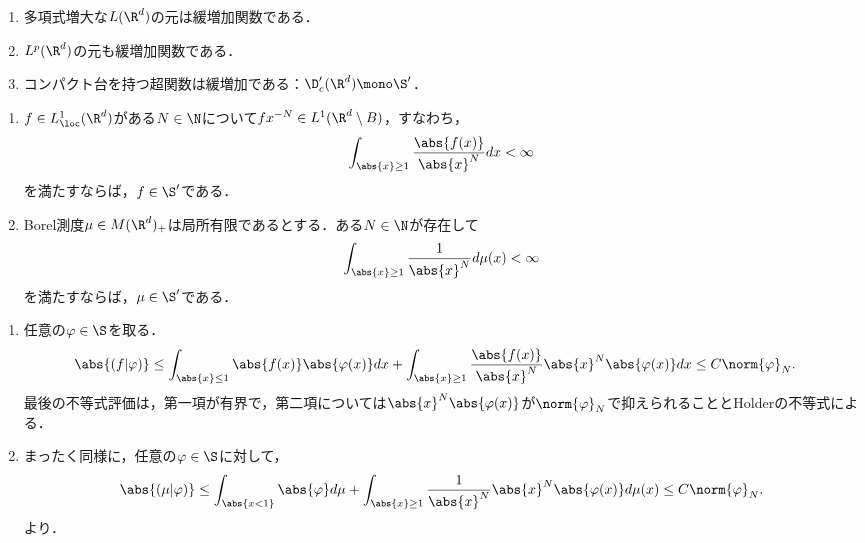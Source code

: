 \documentclass[uplatex,dvipdfmx]{jsreport}
\begin{document}
\begin{tcolorbox}[colframe=ForestGreen, colback=ForestGreen!10!white,breakable,colbacktitle=ForestGreen!40!white,coltitle=black,fonttitle=\bfseries\sffamily,
title=]
    \begin{enumerate}
        \item 多項式増大な$L(\R^d)$の元は緩増加関数である．
        \item $L^p(\R^d)$の元も緩増加関数である．
        \item コンパクト台を持つ超関数は緩増加である：$\D'_c(\R^d)\mono\S'$．
    \end{enumerate}
\end{tcolorbox}

\begin{proposition}[裾が十分に軽い局所可積分関数は緩増加である]\mbox{}\label{prop-sufficient-condition-for-Borel-measure-to-be-tempered}
    \begin{enumerate}
        \item $f\in L^1_\loc(\R^d)$がある$N\in\N$について$fx^{-N}\in L^1(\R^d\setminus B)$，すなわち，
        \[\int_{\abs{x}\ge1}\frac{\abs{f(x)}}{\abs{x}^N}dx<\infty\]
        を満たすならば，$f\in\S'$である．
        \item Borel測度$\mu\in M(\R^d)_+$は局所有限であるとする．ある$N\in\N$が存在して
        \[\int_{\abs{x}\ge1}\frac{1}{\abs{x}^N}d\mu(x)<\infty\]
        を満たすならば，$\mu\in\S'$である．
    \end{enumerate}
\end{proposition}
\begin{Proof}\mbox{}
    \begin{enumerate}
        \item 任意の$\varphi\in\S$を取る．
        \begin{align*}
            \abs{(f|\varphi)}&\le\int_{\abs{x}\le1}\abs{f(x)}\abs{\varphi(x)}dx+\int_{\abs{x}\ge1}\frac{\abs{f(x)}}{\abs{x}^N}\abs{x}^N\abs{\varphi(x)}dx\le C\norm{\varphi}_N.
        \end{align*}
        最後の不等式評価は，第一項が有界で，第二項については$\abs{x}^N\abs{\varphi(x)}$が$\norm{\varphi}_N$で抑えられることとHolderの不等式による．
        \item まったく同様に，任意の$\varphi\in\S$に対して，
        \[\abs{(\mu|\varphi)}\le\int_{\abs{x<1}}\abs{\varphi}d\mu+\int_{\abs{x}\ge1}\frac{1}{\abs{x}^N}\abs{x}^N\abs{\varphi(x)}d\mu(x)\le C\norm{\varphi}_N.\]
        より．
    \end{enumerate}
\end{Proof}
\end{document}
